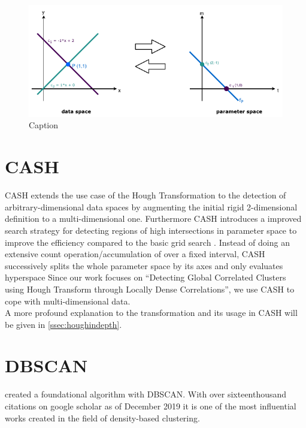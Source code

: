 \begin{figure}
    \centering
    \includegraphics{figures/HoughMXT.pdf}
    \caption{Caption}
    \label{fig:houghmxt}
\end{figure}

\section{CASH}\label{sec:cashintro}
\ac{CASH} extends the use case of the Hough Transformation to the detection of arbitrary-dimensional data spaces by augmenting the initial rigid 2-dimensional definition to a multi-dimensional one. Furthermore \ac{CASH} introduces a improved search strategy for detecting regions of high intersections in parameter space to improve the efficiency compared to the basic grid search \cite{CASHachtert2008robust}. Instead of doing an extensive count operation/accumulation of over a fixed interval, \ac{CASH} successively splits the whole parameter space by its axes and only evaluates hyperspace Since our work focuses on ``Detecting Global Correlated Clusters using Hough Transform through Locally Dense Correlations'', we use \ac{CASH} to cope with multi-dimensional data.\\

A more profound explanation to the transformation and its usage in \ac{CASH} will be given in \autoref{ssec:houghindepth}.


\section{DBSCAN}\label{sec:dbscanintro}
\citeauthor{DBSCANEKSX96} created a foundational algorithm with \ac{DBSCAN}. With over sixteenthousand citations on google scholar as of December 2019 it is one of the most influential works created in the field of density-based clustering. 

